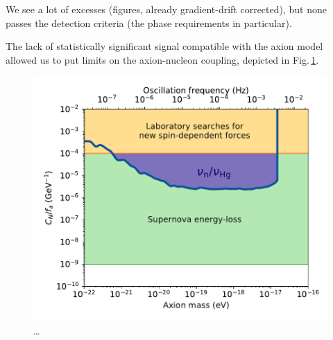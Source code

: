 We see a lot of excesses (figures, already gradient-drift corrected), but none passes the detection criteria (the phase requirements in particular).

The lack of statistically significant signal compatible with the axion model allowed us to put limits on the axion-nucleon coupling, depicted in Fig.\,\ref{fig:axions_wind_limits}. 

\begin{figure}
  \centering
  \includegraphics[width=0.9\linewidth]{gfx/axions/psi_ill_axion_wind_limits_v1.pdf}
  \caption{\ldots}
  \label{fig:axions_wind_limits}
\end{figure}



